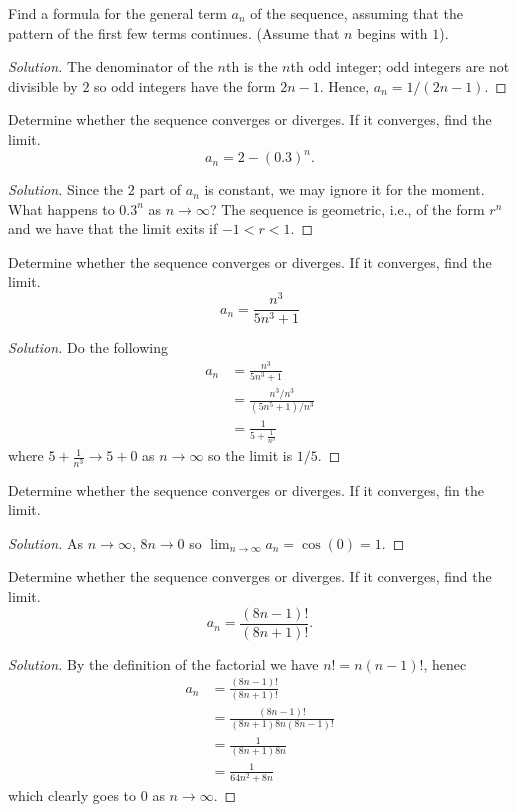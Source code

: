 \begin{problem}[HW 19, \# 3]
Find a formula for the general term $a_n$ of the sequence, assuming that
the pattern of the first few terms continues. (Assume that $n$ begins with
$1$).
\end{problem}
\begin{proof}[Solution]
The denominator of the $n$th is the $n$th odd integer; odd integers are not
divisible by $2$ so odd integers have the form $2n-1$. Hence,
$\boxed{a_n=1/(2n-1)}$.
\end{proof}

\begin{problem}[HW 19, \# 4]
Determine whether the sequence converges or diverges. If it converges, find
the limit.
\[
a_n=2-(0.3)^n.
\]
\end{problem}
\begin{proof}[Solution]
Since the $2$ part of $a_n$ is constant, we may ignore it for the
moment. What happens to $0.3^n$ as $n\to\infty$? The sequence is geometric,
i.e., of the form $r^n$ and we have that the limit exits if $-1<r<1$.
\end{proof}

\begin{problem}[HW 19, \# 5]
Determine whether the sequence converges or diverges. If it converges, find
the limit.
\[
a_n=\frac{n^3}{5n^3+1}
\]
\end{problem}
\begin{proof}[Solution]
Do the following
\begin{align*}
a_n&=\frac{n^3}{5n^3+1}\\
   &=\frac{n^3/n^3}{(5n^5+1)/n^3}\\
   &=\frac{1}{5+\frac{1}{n^3}}
\end{align*}
where $5+\frac{1}{n^3}\to 5+0$ as $n\to\infty$ so the limit is $\boxed{1/5}$.
\end{proof}

\begin{problem}[HW 19, \# 7]
Determine whether the sequence converges or diverges. If it converges, fin
the limit.
\end{problem}
\begin{proof}[Solution]
As $n\to\infty$, $8n\to 0$ so $\lim_{n\to\infty}a_n=\cos(0)=1$.
\end{proof}

\begin{problem}[HW 19, \# 8]
Determine whether the sequence converges or diverges. If it converges, find
the limit.
\[
a_n=\frac{(8n-1)!}{(8n+1)!}.
\]
\end{problem}
\begin{proof}[Solution]
By the definition of the factorial we have $n!=n(n-1)!$, henec
\begin{align*}
a_n&=\frac{(8n-1)!}{(8n+1)!}\\
   &=\frac{(8n-1)!}{(8n+1)8n(8n-1)!}\\
   &=\frac{1}{(8n+1)8n}\\
   &=\frac{1}{64n^2+8n}
\end{align*}
which clearly goes to $0$ as $n\to\infty$.
\end{proof}


